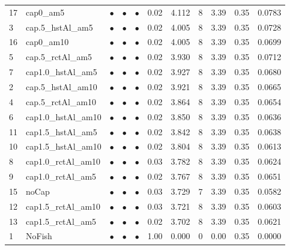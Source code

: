 \documentclass[11pt]{book}
\begin{document}
\begin{landscape}
\begin{longtable}[t]{llccccccccc}
17 & cap0\_am5 & $\bullet$ & $\bullet$ & $\bullet$ & 0.02 & 4.112 & 8 & 3.39 & 0.35 & 0.0783\\
3 & cap.5\_hstAl\_am5 & $\bullet$ & $\bullet$ & $\bullet$ & 0.02 & 4.005 & 8 & 3.39 & 0.35 & 0.0728\\
16 & cap0\_am10 & $\bullet$ & $\bullet$ & $\bullet$ & 0.02 & 4.005 & 8 & 3.39 & 0.35 & 0.0699\\
5 & cap.5\_rctAl\_am5 & $\bullet$ & $\bullet$ & $\bullet$ & 0.02 & 3.930 & 8 & 3.39 & 0.35 & 0.0712\\
7 & cap1.0\_hstAl\_am5 & $\bullet$ & $\bullet$ & $\bullet$ & 0.02 & 3.927 & 8 & 3.39 & 0.35 & 0.0680\\
2 & cap.5\_hstAl\_am10 & $\bullet$ & $\bullet$ & $\bullet$ & 0.02 & 3.921 & 8 & 3.39 & 0.35 & 0.0665\\
4 & cap.5\_rctAl\_am10 & $\bullet$ & $\bullet$ & $\bullet$ & 0.02 & 3.864 & 8 & 3.39 & 0.35 & 0.0654\\
6 & cap1.0\_hstAl\_am10 & $\bullet$ & $\bullet$ & $\bullet$ & 0.02 & 3.850 & 8 & 3.39 & 0.35 & 0.0636\\
11 & cap1.5\_hstAl\_am5 & $\bullet$ & $\bullet$ & $\bullet$ & 0.02 & 3.842 & 8 & 3.39 & 0.35 & 0.0638\\
10 & cap1.5\_hstAl\_am10 & $\bullet$ & $\bullet$ & $\bullet$ & 0.02 & 3.804 & 8 & 3.39 & 0.35 & 0.0613\\
8 & cap1.0\_rctAl\_am10 & $\bullet$ & $\bullet$ & $\bullet$ & 0.03 & 3.782 & 8 & 3.39 & 0.35 & 0.0624\\
9 & cap1.0\_rctAl\_am5 & $\bullet$ & $\bullet$ & $\bullet$ & 0.02 & 3.767 & 8 & 3.39 & 0.35 & 0.0651\\
15 & noCap & $\bullet$ & $\bullet$ & $\bullet$ & 0.03 & 3.729 & 7 & 3.39 & 0.35 & 0.0582\\
12 & cap1.5\_rctAl\_am10 & $\bullet$ & $\bullet$ & $\bullet$ & 0.03 & 3.721 & 8 & 3.39 & 0.35 & 0.0603\\
13 & cap1.5\_rctAl\_am5 & $\bullet$ & $\bullet$ & $\bullet$ & 0.02 & 3.702 & 8 & 3.39 & 0.35 & 0.0621\\
1 & NoFish & $\bullet$ & $\bullet$ & $\bullet$ & 1.00 & 0.000 & 0 & 0.00 & 0.35 & 0.0000\\*
\end{longtable}
\end{landscape}
\endgroup{}

\newpage
\end{document}
